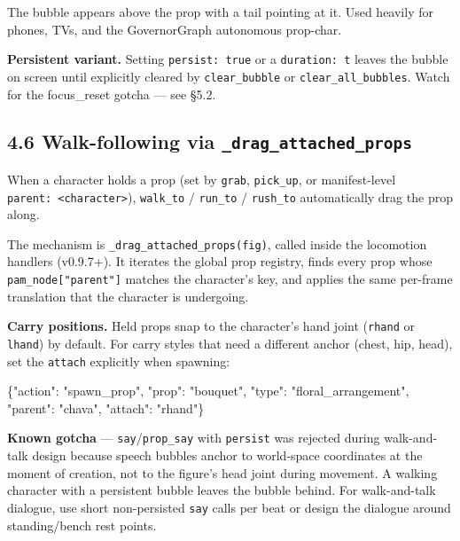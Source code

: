 \documentclass[
  11pt,
]{book}
\newenvironment{Shaded}{}{}
\newcommand{\DataTypeTok}[1]{\textcolor[rgb]{0.56,0.13,0.00}{#1}}
\newcommand{\FunctionTok}[1]{\textcolor[rgb]{0.02,0.16,0.49}{#1}}
\newcommand{\StringTok}[1]{\textcolor[rgb]{0.25,0.44,0.63}{#1}}
\begin{document}
The bubble appears above the prop with a tail pointing at it. Used
heavily for phones, TVs, and the GovernorGraph autonomous prop-char.

\textbf{Persistent variant.} Setting \texttt{persist:\ true} or a
\texttt{duration:\ t} leaves the bubble on screen until explicitly
cleared by \texttt{clear\_bubble} or \texttt{clear\_all\_bubbles}. Watch
for the focus\_reset gotcha --- see §5.2.

\subsection{\texorpdfstring{4.6 Walk-following via
\texttt{\_drag\_attached\_props}}{4.6 Walk-following via \_drag\_attached\_props}}\label{walk-following-via-_drag_attached_props}

When a character holds a prop (set by \texttt{grab}, \texttt{pick\_up},
or manifest-level \texttt{parent:\ \textless{}character\textgreater{}}),
\texttt{walk\_to} / \texttt{run\_to} / \texttt{rush\_to} automatically
drag the prop along.

The mechanism is \texttt{\_drag\_attached\_props(fig)}, called inside
the locomotion handlers (v0.9.7+). It iterates the global prop registry,
finds every prop whose \texttt{pam\_node{[}"parent"{]}} matches the
character's key, and applies the same per-frame translation that the
character is undergoing.

\textbf{Carry positions.} Held props snap to the character's hand joint
(\texttt{rhand} or \texttt{lhand}) by default. For carry styles that
need a different anchor (chest, hip, head), set the \texttt{attach}
explicitly when spawning:

\begin{Shaded}
\begin{Highlighting}[]
\FunctionTok{\{}\DataTypeTok{"action"}\FunctionTok{:} \StringTok{"spawn\_prop"}\FunctionTok{,} \DataTypeTok{"prop"}\FunctionTok{:} \StringTok{"bouquet"}\FunctionTok{,}
 \DataTypeTok{"type"}\FunctionTok{:} \StringTok{"floral\_arrangement"}\FunctionTok{,}
 \DataTypeTok{"parent"}\FunctionTok{:} \StringTok{"chava"}\FunctionTok{,} \DataTypeTok{"attach"}\FunctionTok{:} \StringTok{"rhand"}\FunctionTok{\}}
\end{Highlighting}
\end{Shaded}

\textbf{Known gotcha} --- \texttt{say}/\texttt{prop\_say} with
\texttt{persist} was rejected during walk-and-talk design because speech
bubbles anchor to world-space coordinates at the moment of creation, not
to the figure's head joint during movement. A walking character with a
persistent bubble leaves the bubble behind. For walk-and-talk dialogue,
use short non-persisted \texttt{say} calls per beat or design the
dialogue around standing/bench rest points.
\end{document}
